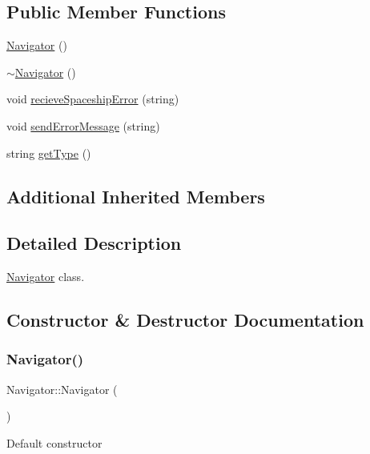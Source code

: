 \subsection*{Public Member Functions}
\begin{DoxyCompactItemize}
\item 
\hyperlink{classNavigator_a59230ab4698882f754d5ce275a1a4030}{Navigator} ()
\item 
\hyperlink{classNavigator_a81bb9c10588736497700032d8b61e9d1}{$\sim$\+Navigator} ()
\item 
void \hyperlink{classNavigator_a7dc06965001f658cff3c5f0dcac39def}{recieve\+Spaceship\+Error} (string)
\item 
void \hyperlink{classNavigator_a72ce12655f579879aae63b118c906b91}{send\+Error\+Message} (string)
\item 
string \hyperlink{classNavigator_a3b6314e429bc38e2cd330db7c187a7ae}{get\+Type} ()
\end{DoxyCompactItemize}
\subsection*{Additional Inherited Members}


\subsection{Detailed Description}
\hyperlink{classNavigator}{Navigator} class. 

\subsection{Constructor \& Destructor Documentation}
\mbox{\label{classNavigator_a59230ab4698882f754d5ce275a1a4030}} 
\subsubsection{\texorpdfstring{Navigator()}{Navigator()}}
{\footnotesize\ttfamily Navigator\+::\+Navigator (\begin{DoxyParamCaption}{ }\end{DoxyParamCaption})\hspace{0.3cm}{\ttfamily [inline]}}

Default constructor \mbox{\label{classNavigator_a81bb9c10588736497700032d8b61e9d1}} 
